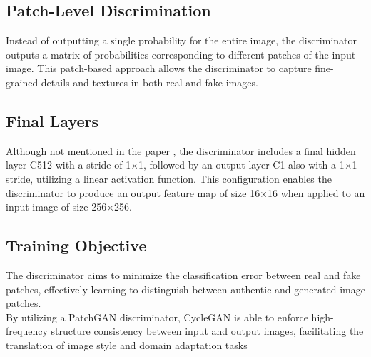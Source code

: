 \subsection*{Patch-Level Discrimination}
 Instead of outputting a single probability for the entire image, the discriminator outputs a matrix of probabilities corresponding to different patches of the input image. This patch-based approach allows the discriminator to capture fine-grained details and textures in both real and fake images.
 \subsection*{Final Layers}
 Although not mentioned in the paper \cite{zhu2020unpaired}, the discriminator includes a final hidden layer C512 with a stride of 1×1, followed by an output layer C1 also with a 1×1 stride, utilizing a linear activation function. This configuration enables the discriminator to produce an output feature map of size 16×16 when applied to an input image of size 256×256.
  \subsection*{Training Objective}
  The discriminator aims to minimize the classification error between real and fake patches, effectively learning to distinguish between authentic and generated image patches. \\
  
  By utilizing a PatchGAN discriminator, CycleGAN is able to enforce high-frequency structure consistency between input and output images, facilitating the translation of image style and domain adaptation tasks



